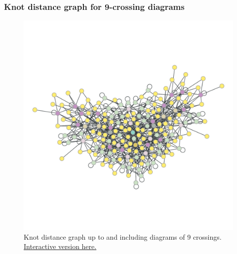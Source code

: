 \documentclass[presentation]{beamer}
\begin{document}
\begin{frame}
  \frametitle{Knot distance graph for 9-crossing diagrams}
  \begin{figure}
    \centering
    \vspace{-.17\textheight}
    \includegraphics[width=\textwidth,height=\textheight,keepaspectratio]{9x_distances.pdf}
    \vspace{-.17\textheight}
    \caption{Knot distance graph up to and including diagrams of 9
      crossings. \href{http://hchapman.github.io/research/9x_graph.html}{Interactive
        version here.}}
    \label{fig:9xgraph}
  \end{figure}
\end{frame}
\end{document}
